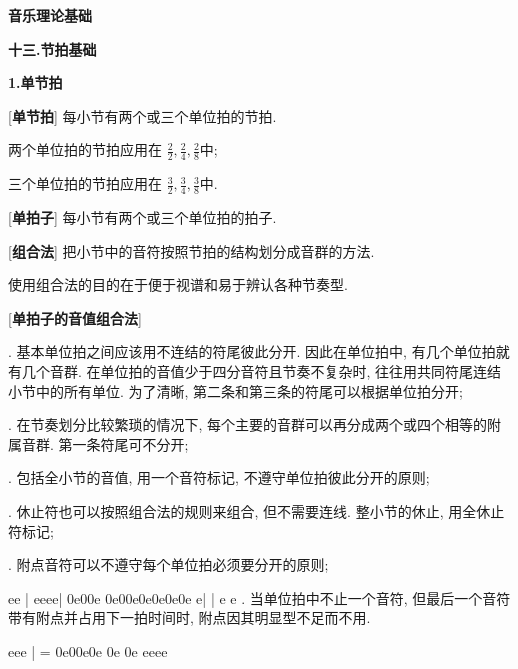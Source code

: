 

\begin{center} 
 \Large \textbf{音乐理论基础}\par
 \textbf{十三.节拍基础}
\end{center}

\large 
\begin{center}
 \textbf{1.单节拍}\\
\end{center}

[\textbf{单节拍}] 每小节有两个或三个单位拍的节拍.\par
\qquad 两个单位拍的节拍应用在 $\frac{2}{2}, \frac{2}{4}, \frac{2}{8}$中;\par
\qquad 三个单位拍的节拍应用在 $\frac{3}{2}, \frac{3}{4}, \frac{3}{8}$中.\par

[\textbf{单拍子}] 每小节有两个或三个单位拍的拍子.\par

[\textbf{组合法}] 把小节中的音符按照节拍的结构划分成音群的方法.\par
\qquad 使用组合法的目的在于便于视谱和易于辨认各种节奏型.\par

[\textbf{单拍子的音值组合法}]\par
{}. 基本单位拍之间应该用不连结的符尾彼此分开. 因此在单位拍中, 有几个单位拍就有几个音群. 在单位拍的音值少于四分音符且节奏不复杂时, 往往用共同符尾连结小节中的所有单位. 为了清晰, 第二条和第三条的符尾可以根据单位拍分开;\par
{}. 在节奏划分比较繁琐的情况下, 每个主要的音群可以再分成两个或四个相等的附属音群. 第一条符尾可不分开;\par
{}. 包括全小节的音值, 用一个音符标记, 不遵守单位拍彼此分开的原则;\par
{}. 休止符也可以按照组合法的规则来组合, 但不需要连线. 整小节的休止, 用全休止符标记;\par
{}. 附点音符可以不遵守每个单位拍必须要分开的原则;\par
{}
\startextract
\Notes \ha e\ha e \en\bar
\Notes \qa e\Dqbu ee\ha e\en\bar
\Notes \ibu0e0\qbp0e \ibu0e0\qb0e\qb0e\qb0e\qb0e\qb0e \qa e\en\bar
\Notes {}\en\bar
\Notes {} \ca e \qa e\en
\zendextract
{}. 当单位拍中不止一个音符, 但最后一个音符带有附点并占用下一拍时间时, 附点因其明显型不足而不用.\par
{}
\startextract
\Notes {} \Tqbbu eee \en\bar
\Notes = \ibu0e0\qb0e\qb0e \islurd0e \en \Notes \tslur0e \Qqbbu eeee \en
\zendextract

